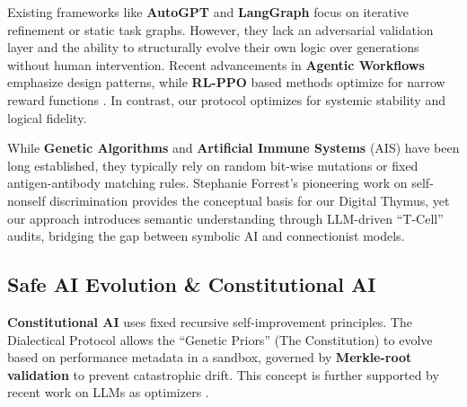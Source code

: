 Existing frameworks like \textbf{AutoGPT} \cite{siggrav2023autogpt} and \textbf{LangGraph} \cite{langgraph2023} focus on iterative refinement or static task graphs. However, they lack an adversarial validation layer and the ability to structurally evolve their own logic over generations without human intervention. Recent advancements in \textbf{Agentic Workflows} \cite{ng2024agentic} emphasize design patterns, while \textbf{RL-PPO} based methods optimize for narrow reward functions \cite{ouyang2022training}. In contrast, our protocol optimizes for systemic stability and logical fidelity.

While \textbf{Genetic Algorithms} \cite{goldberg1989genetic} and \textbf{Artificial Immune Systems} (AIS) \cite{de2002artificial, dasgupta2011artificial} have been long established, they typically rely on random bit-wise mutations or fixed antigen-antibody matching rules. Stephanie Forrest's pioneering work on self-nonself discrimination \cite{forrest1994self} provides the conceptual basis for our Digital Thymus, yet our approach introduces semantic understanding through LLM-driven ``T-Cell'' audits, bridging the gap between symbolic AI and connectionist models.

\subsection{Safe AI Evolution \& Constitutional AI}
\textbf{Constitutional AI} \cite{bai2022constitutional} uses fixed recursive self-improvement principles. The Dialectical Protocol allows the ``Genetic Priors'' (The Constitution) to evolve based on performance metadata in a sandbox, governed by \textbf{Merkle-root validation} to prevent catastrophic drift. This concept is further supported by recent work on LLMs as optimizers \cite{yang2023llm_optimizer}.
